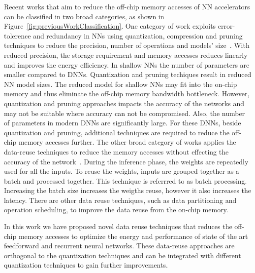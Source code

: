 \documentclass[a4paper,10pt]{article}
\begin{document}
Recent works that aim to reduce the off-chip memory accesses of NN accelerators can be classified in two broad categories, as shown in Figure~\ref{fig:previousWorkClassification}. One category of work exploits error-tolerence and redundancy in NNs using quantization, compression and pruning techniques to reduce the precision, number of operations and models' size~\cite{ferreira2016fpga,wang2018c,chang2015recurrent,han2017ese,lee2016fpga}. With reduced precision, the storage requirement and memory accesses reduces linearly and improves the energy efficiency. In shallow NNs the number of parameters are smaller compared to DNNs. Quantization and pruning techiques result in reduced NN model sizes. The reduced model for shallow NNs may fit into the on-chip memory and thus eliminate the off-chip memory bandwidth bottleneck. However, quantization and pruning approaches impacts the accuracy of the networks and may not be suitable where accuracy can not be compromised. Also, the number of parameters in modern DNNs are significantly large. For these DNNs, beside quantization and pruning, additional techniques are required to reduce the off-chip memory accesses further.
The other broad category of works applies the data-reuse techniques to reduce the memory accesses without effecting the accuracy of the network~\cite{zhang2015optimizing,Li2018SmartShuttleOO,que2019efficient,park2020time}. During the inference phase, the weights are repeatedly used for all the inputs. To reuse the weights, inputs are grouped together as a batch and processed together. This technique is referrred to as batch processing. Increasing the batch size increases the weigths reuse, however it also increases the latency. There are other data reuse techniques, such as data partitioning and operation scheduling, to improve the data reuse from the on-chip memory.  

In this work we have proposed novel data reuse techniques that reduces the off-chip memory accesses to optimize the energy and performance of state of the art feedforward and recurrent neural networks. These data-reuse approaches are orthogonal to the quantization techniques and can be integrated with different quantization techniques to gain further improvements.
\end{document}

